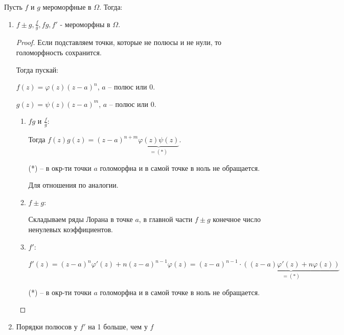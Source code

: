 \begin{properties}
    Пусть $f$ и $g$ мероморфные в $\Omega$. Тогда:

    \begin{enumerate}
        \item {
            $f \pm g, \frac{f}{g}, fg, f'$ - мероморфны в $\Omega$.

            \begin{proof}

                Если подставляем точки, которые не полюсы и не нули, то голоморфность сохранится.

                Тогда пускай:

                $f(z) = \varphi (z) (z - a)^n$, $a$ -- полюс или $0$.

                $g(z) = \psi (z) (z - a)^m$, $a$ -- полюс или $0$.

                \begin{enumerate}
                    \item {
                        $fg$ и $\frac{f}{g}$:

                        Тогда $f(z)g(z) = (z - a)^{n + m} \underbrace{\varphi(z) \psi(z)}_{= (*)}$.

                        (*) -- в окр-ти точки $a$ голоморфна и в самой точке в ноль не обращается.

                        Для отношения по аналогии.
                    }
                    \item {
                        $f \pm g$:

                        Складываем ряды Лорана в точке $a$, в главной части $f \pm g$ конечное число ненулевых коэффициентов.
                    }
                    \item {
                        $f'$:

                        $f'(z) = (z - a)^n \varphi'(z) + n (z - a)^{n - 1} \varphi(z) = (z - a)^{n - 1} \cdot \underbrace{\left( (z - a) \varphi'(z) + n \varphi(z) \right)}_{= (*)}$

                        (*) -- в окр-ти точки $a$ голоморфна и в самой точке в ноль не обращается.


                    }
                \end{enumerate}
            \end{proof}
        }
        \item {
            Порядки полюсов у $f'$ на 1 больше, чем у $f$
        }
    \end{enumerate}
\end{properties}


